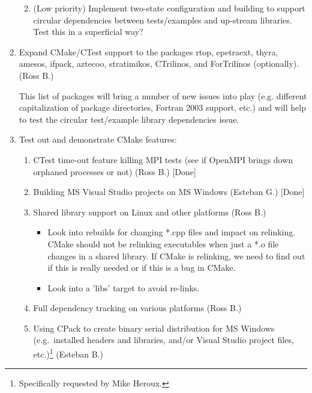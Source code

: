 \begin{enumerate}
\begin{enumerate}
  {}\item (Low priority) Implement two-state configuration and
  building to support circular dependencies between tests/examples and
  up-stream libraries.  Test this in a superficial way?

  \end{enumerate}

{}\item Expand CMake/CTest support to the packages rtop, epetraext,
thyra, amesos, ifpack, aztecoo, stratimikos, CTrilinos, and
ForTrilinos (optionally). (Ross B.)

This list of packages will bring a number of new issues into play
(e.g. different capitalization of package directories, Fortran 2003
support, etc.)  and will help to test the circular test/example
library dependencies issue.

{}\item Test out and demonstrate CMake features:

  \begin{enumerate}

  {}\item CTest time-out feature killing MPI tests (see if OpenMPI
  brings down orphaned processes or not) (Ross B.) [Done]

  {}\item Building MS Visual Studio projects on MS Windows (Esteban
  G.) [Done]

  {}\item Shared library support on Linux and other platforms (Ross B.)

    \begin{itemize}

    {}\item Look into rebuilds for changing *.cpp files and impact on
    relinking.  CMake should not be relinking executables when just a
    *.o file changes in a shared library.  If CMake is relinking, we
    need to find out if this is really needed or if this is a bug in
    CMake.

    {}\item Look into a 'libs' target to avoid re-links.

    \end{itemize}

  {}\item Full dependency tracking on various platforms (Ross B.)

  {}\item Using CPack to create binary serial distribution for MS
  Windows (e.g.\ installed headers and libraries, and/or Visual Studio
  project files, etc.)\footnote{Specifically requested by Mike
  Heroux.} (Esteban B.)

  \end{enumerate}

\end{enumerate}

